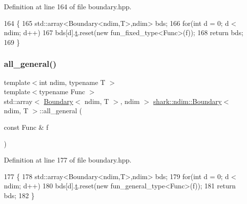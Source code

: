 Definition at line 164 of file boundary.\+hpp.


\begin{DoxyCode}
164                                                                                  \{
165             std::array<Boundary<ndim,T>,ndim> bds;
166             \textcolor{keywordflow}{for}(\textcolor{keywordtype}{int} d = 0; d < ndim; d++)
167                 bds[d].\hyperlink{classshark_1_1ndim_1_1_boundary_a16fdfa33d88480b4127ff36c1f1a2ce7}{t}.reset(\textcolor{keyword}{new} fun\_fixed\_type<Func>(f));
168             \textcolor{keywordflow}{return} bds;
169         \}
\end{DoxyCode}
\hypertarget{classshark_1_1ndim_1_1_boundary_abad9349a25882ff5d9f6b7d4db8e27ce}{}\label{classshark_1_1ndim_1_1_boundary_abad9349a25882ff5d9f6b7d4db8e27ce} 
\subsubsection{\texorpdfstring{all\+\_\+general()}{all\_general()}}
{\footnotesize\ttfamily template$<$int ndim, typename T $>$ \\
template$<$typename Func $>$ \\
std\+::array$<$ \hyperlink{classshark_1_1ndim_1_1_boundary}{Boundary}$<$ ndim, T $>$, ndim $>$ \hyperlink{classshark_1_1ndim_1_1_boundary}{shark\+::ndim\+::\+Boundary}$<$ ndim, T $>$\+::all\+\_\+general (\begin{DoxyParamCaption}\item[{const Func \&}]{f }\end{DoxyParamCaption})\hspace{0.3cm}{\ttfamily [static]}}



Definition at line 177 of file boundary.\+hpp.


\begin{DoxyCode}
177                                                                                    \{
178             std::array<Boundary<ndim,T>,ndim> bds;
179             \textcolor{keywordflow}{for}(\textcolor{keywordtype}{int} d = 0; d < ndim; d++)
180                 bds[d].\hyperlink{classshark_1_1ndim_1_1_boundary_a16fdfa33d88480b4127ff36c1f1a2ce7}{t}.reset(\textcolor{keyword}{new} fun\_general\_type<Func>(f));
181             \textcolor{keywordflow}{return} bds;
182         \}
\end{DoxyCode}
\hypertarget{classshark_1_1ndim_1_1_boundary_a79f22388bb5c66d131918c1b68125a90}{}\label{classshark_1_1ndim_1_1_boundary_a79f22388bb5c66d131918c1b68125a90} 
